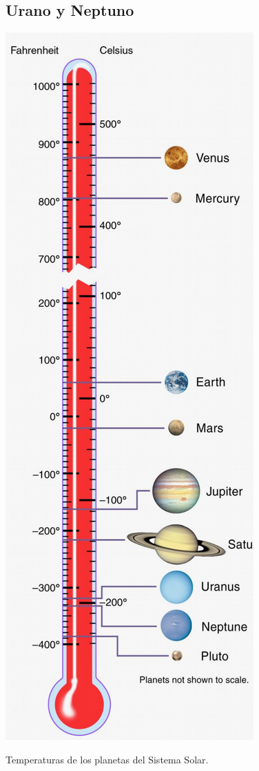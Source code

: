 \documentclass{tufte-handout}
\begin{document}
\subsection{Urano y Neptuno}

\begin{marginfigure}
  \includegraphics[width=\linewidth]{img/solar_system_temperatures}
  \caption{Temperaturas de los planetas del Sistema Solar.}
\end{marginfigure}
\end{document}
